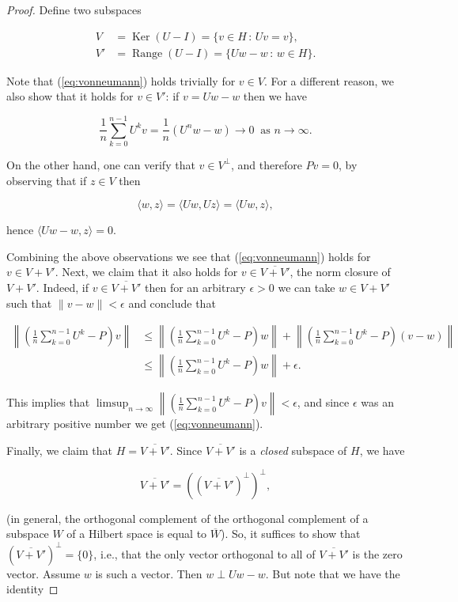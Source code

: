 \begin{proof}
Define two subspaces

\begin{align*}
V&=\operatorname{Ker}(U-I) = \{ v\in H\,:\, Uv=v \}, \\
V'&=\operatorname{Range}(U-I) = \{ Uw-w \,:\, w\in H \}.
\end{align*}

\noindent Note that (\ref{eq:vonneumann}) holds trivially for
$v\in V$. For a different reason, we also show that
it holds for $v\in V'$: if $v=Uw-w$ then we have

\[
\frac{1}{n}\sum_{k=0}^{n-1} U^k v  = \frac{1}{n}\left( U^n w - w \right) \to 0\ \textrm{ as }n\to\infty.
\]

\noindent On the other hand, one can verify that $v\in V^\perp$,
and therefore $Pv=0$, by observing that if $z\in V$
then

\[
\langle w, z \rangle = \langle Uw,Uz \rangle =
\langle Uw,z\rangle,
\]

\noindent hence $\langle Uw-w,z\rangle = 0$.

Combining the above observations we see that
(\ref{eq:vonneumann}) holds for $v\in V+V'$. Next, we
claim that it also holds for $v\in \overline{V+V'}$,
the norm closure of $V+V'$. Indeed, if
$v\in \overline{V+V'}$ then for an arbitrary
$\epsilon>0$ we can take $w\in V+V'$ such that
$\lVert v-w\rVert < \epsilon$ and conclude that

\begin{align*}
\left\lVert \left(\frac{1}{n}\sum_{k=0}^{n-1} U^k-P\right)v \right\rVert
& \le
\left\lVert \left(\frac{1}{n}\sum_{k=0}^{n-1} U^k-P\right)w \right\rVert
+
\left\lVert \left(\frac{1}{n}\sum_{k=0}^{n-1} U^k-P\right)(v-w) \right\rVert \\
& \le
\left\lVert \left(\frac{1}{n}\sum_{k=0}^{n-1} U^k-P\right)w \right\rVert
+  \epsilon.
\end{align*}

\noindent This implies that
$\limsup_{n\to\infty} \left\lVert
\left(\frac{1}{n}\sum_{k=0}^{n-1} U^k-P\right)v
\right\rVert < \epsilon$,
and since $\epsilon$ was an arbitrary positive number
we get (\ref{eq:vonneumann}).

Finally, we claim that $H=\overline{V+V'}$. Since
$\overline{V+V'}$ is a \emph{closed} subspace of $H$, we
have

\[
\overline{V+V'} = \left( \left(\overline{V+V'}\right)^\perp \right)^\perp,
\]

\noindent (in general, the orthogonal complement of the
orthogonal complement of a subspace $W$ of a Hilbert
space is equal to $\overline{W}$). So, it suffices to
show that $\left(\overline{V+V'}\right)^\perp=\{0\}$,
i.e., that the only vector orthogonal to all of
$\overline{V+V'}$ is the zero vector. Assume $w$ is
such a vector. Then $w \perp Uw-w$. But note that we
have the identity


\end{proof}

